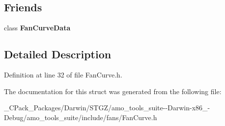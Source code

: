 \subsection*{Friends}
\begin{DoxyCompactItemize}
\item 
\mbox{\label{struct_fan_curve_data_1_1_base_curve_a6c0df668730aa3a6673d279f2bbe7799}} 
class {\bfseries Fan\+Curve\+Data}
\end{DoxyCompactItemize}


\subsection{Detailed Description}


Definition at line 32 of file Fan\+Curve.\+h.



The documentation for this struct was generated from the following file\+:\begin{DoxyCompactItemize}
\item 
\+\_\+\+C\+Pack\+\_\+\+Packages/\+Darwin/\+S\+T\+G\+Z/amo\+\_\+tools\+\_\+suite-\/-\/\+Darwin-\/x86\+\_-\/\+Debug/amo\+\_\+tools\+\_\+suite/include/fans/Fan\+Curve.\+h\end{DoxyCompactItemize}
